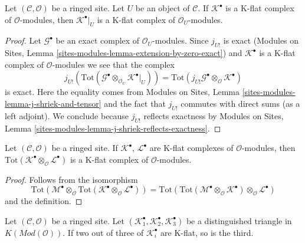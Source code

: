 \begin{lemma}
\label{lemma-restriction-K-flat}
Let $(\mathcal{C}, \mathcal{O})$ be a ringed site.
Let $U$ be an object of $\mathcal{C}$.
If $\mathcal{K}^\bullet$ is a K-flat complex of $\mathcal{O}$-modules, then
$\mathcal{K}^\bullet|_U$ is a K-flat complex of $\mathcal{O}_U$-modules.
\end{lemma}

\begin{proof}
Let $\mathcal{G}^\bullet$ be an exact complex of $\mathcal{O}_U$-modules.
Since $j_{U!}$ is exact
(Modules on Sites, Lemma \ref{sites-modules-lemma-extension-by-zero-exact})
and $\mathcal{K}^\bullet$ is a K-flat complex of $\mathcal{O}$-modules
we see that the complex
$$
j_{U!}(\text{Tot}(\mathcal{G}^\bullet \otimes_{\mathcal{O}_U}
\mathcal{K}^\bullet|_U)) =
\text{Tot}(j_{U!}\mathcal{G}^\bullet \otimes_\mathcal{O} \mathcal{K}^\bullet)
$$
is exact. Here the equality comes from
Modules on Sites, Lemma \ref{sites-modules-lemma-j-shriek-and-tensor}
and the fact that $j_{U!}$ commutes with direct sums (as a left adjoint).
We conclude because $j_{U!}$ reflects exactness by
Modules on Sites, Lemma \ref{sites-modules-lemma-j-shriek-reflects-exactness}.
\end{proof}

\begin{lemma}
\label{lemma-tensor-product-K-flat}
Let $(\mathcal{C}, \mathcal{O})$ be a ringed site.
If $\mathcal{K}^\bullet$, $\mathcal{L}^\bullet$ are K-flat complexes
of $\mathcal{O}$-modules, then
$\text{Tot}(\mathcal{K}^\bullet \otimes_\mathcal{O} \mathcal{L}^\bullet)$
is a K-flat complex of $\mathcal{O}$-modules.
\end{lemma}

\begin{proof}
Follows from the isomorphism
$$
\text{Tot}(\mathcal{M}^\bullet \otimes_\mathcal{O}
\text{Tot}(\mathcal{K}^\bullet \otimes_\mathcal{O} \mathcal{L}^\bullet))
=
\text{Tot}(\text{Tot}(\mathcal{M}^\bullet \otimes_\mathcal{O}
\mathcal{K}^\bullet) \otimes_\mathcal{O} \mathcal{L}^\bullet)
$$
and the definition.
\end{proof}

\begin{lemma}
\label{lemma-K-flat-two-out-of-three}
Let $(\mathcal{C}, \mathcal{O})$ be a ringed site.
Let $(\mathcal{K}_1^\bullet, \mathcal{K}_2^\bullet, \mathcal{K}_3^\bullet)$
be a distinguished triangle in $K(\textit{Mod}(\mathcal{O}))$.
If two out of three of $\mathcal{K}_i^\bullet$ are K-flat, so is the third.
\end{lemma}

